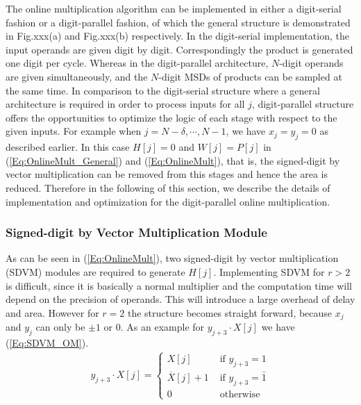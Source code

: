 \documentclass[a4paper, 11pt]{article}
\begin{document}
The online multiplication algorithm can be implemented in either a digit-serial fashion or a digit-parallel fashion, of which the general structure is demonstrated in Fig.xxx(a) and Fig.xxx(b) respectively. In the digit-serial implementation, the input operands are given digit by digit. Correspondingly the product is generated one digit per cycle. Whereas in the digit-parallel architecture, $N$-digit operands are given simultaneously, and the $N$-digit MSDs of products can be sampled at the same time. In comparison to the digit-serial structure where a general architecture is required in order to process inputs for all $j$, digit-parallel structure offers the opportunities to optimize the logic of each stage with respect to the given inputs. For example when $j=N-\delta,\cdots,N-1$, we have $x_j=y_j=0$ as described earlier. In this case $H[j]=0$ and $W[j]=P[j]$ in (\ref{Eq:OnlineMult_General}) and (\ref{Eq:OnlineMult}), that is, the signed-digit by vector multiplication can be removed from this stages and hence the area is reduced. Therefore in the following of this section, we describe the details of implementation and optimization for the digit-parallel online multiplication.

\subsubsection{Signed-digit by Vector Multiplication Module}
As can be seen in (\ref{Eq:OnlineMult}), two signed-digit by vector multiplication (SDVM) modules are required to generate $H[j]$. Implementing SDVM for $r>2$ is difficult, since it is basically a normal multiplier and the computation time will depend on the precision of operands. This will introduce a large overhead of delay and area. However for $r=2$ the structure becomes straight forward, because $x_j$ and $y_j$ can only be $\pm1$ or $0$. As an example for $y_{j+3}\cdot X[j]$ we have (\ref{Eq:SDVM_OM}).
\begin{eqnarray}\label{Eq:SDVM_OM}
  y_{j+3}\cdot X[j]=\begin{cases}
    X[j]          & \text{ if } y_{j+3}=1 \\ 
    \overline{X}[j]+1  & \text{ if }y_{j+3}=\bar{1} \\ 
    0             & \text{ otherwise }
  \end{cases}
\end{eqnarray}
\end{document}
